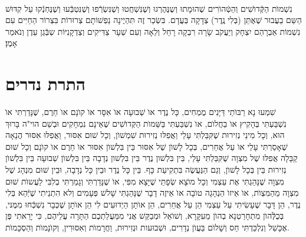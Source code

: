 \documentclass[twoside, openany, parskip=half, 11pt]{book}
\begin{document}
\\
 נִשְׁמוׂת הַקְּֿדוׂשִׁים וְהַטְּֿהוׂרִים
  שֶׁהוּמָתוּ וְשֶנֶּהֶרְגוּ וְשֶׁנִּשְׁחֲטוּ וְשֶׁנִּשְׂרְֿפוּ וְשֶׁנִּטְבְּֿעוּ וְשֶׁנֶּחְנְֿקוּ עַל קִדּוּשׁ הַשֵּם בַעֲבוּר שֶׁאֶתֵּן (בְּלִי נֶֽדֶר) צְדָקָה בְּעֲדָם. בִּשְׂכַר זֶה תִּהְיֶינָה נַפְשׁוֹתָם צְרוּרוֹת בִּצְרוֹר הַחַיִּים עִם נִשְׁמוֹת אַבְרָהַם יִצְחָק וְיַעֲקֹב שָׂרָה רִבְקָה רָחֵל וְלֵאָה וְעִם שְׁעָר צַדִּיקִים וְצַדְקָנִיּוֹת שְבְּֿגַן עֵדֶן וְנֹאמַר אָמֶן׃

\chapter[התרת נדרים]{ התרת נדרים }


שִׁמְעוּ נָא רַבּוׂתַי דַּיָּנִים מֻמְחִים, כָּל נֶדֶר אוׂ שְׁבוּעָה אוׂ אִסָּר אוׂ קוׂנָם אוׂ חֵרֶם, שֶׁנָּדַרְתִּי אוׂ נִשְׁבַּעְתִּי בְּהָקִיץ אוׂ בַחֲלוׂם, אוׂ נִשְׁבַּעְתִּי בַּשֵּׁמוׂת הַקְּדוׂשִׁים שֶׁאֵינָם נִמְחָקִים וּבְשֵׁם הוי"ה בָּרוּךְ הוּא, וְכָל מִינֵי נְזִירוּת שֶׁקִּבַּלְתִּי עָלַי וַאֲפִלּוּ נְזִירוּת שִׁמְשׁוׂן, וְכָל שׁוּם אִסּוּר, וַאֲפִלּוּ אִסּוּר הֲנָאָה שֶׁאָסַרְתִּי עָלַי אוׂ עַל אֲחֵרִים, בְּכָל לָשׁוׂן שֶׁל אִסּוּר בֵּין בִּלְשׁוׂן אִסּוּר אוׂ חֵרֶם אוׂ קוׂנָם וְכָל שׁוּם קַבָּלָה אֲפִלּוּ שֶׁל מִצְוָה שֶׁקִּבַּלְתִּי עָלַי, בֵּין בִּלְשׁון נֶדֶר בֵּין בִּלְשׁון נְדָבָה בֵּין בִּלְשׁוׂן שְׁבוּעָה בֵּין בִּלְשׁוׂן נְזִירוּת בֵּין בְּכָל לָשׁוׂן, וְגַם הַנַּעֲשֶׂה בִּתְקִיעַת כָּף. בֵּין כָּל נֶדֶר וּבֵין כָּל נְדָבָה, וּבֵין שׁוּם מִנְהָג שֶׁל מִצְוָה שֶׁנָּהַגְתִּי אֶת עַצְמִי וְכָל מוׂצָא שְׂפָתַי שֶׁיָּצָא מִפִּי, אוׂ שֶׁנָּדַרְתִּי וְגָמַרְתִּי בְלִבִּי לַעֲשוׂת שׁוּם מִצְוָה מֵהַמִּצְוׂת, אוׂ אֵיזוׂ הַנְהָגָה טוׂבָה אוׂ אֵיזֶה דָבָר שֶׁנָּהַגְתִּי שָׁלשׁ פְּעָמִים וְלא הִתְנֵיתִי שֶׁיְּֿהֵא בְּלִי נֶדֶר, הֵן דָּבָר שֶׁעָשִׂיתִי עַל עַצְמִי הֵן עַל אֲחֵרִים, הֵן אוׂתָן הַיְדוּעִים לִי הֵן אוׂתָן שֶׁכְּבָר נִשְׁכְּֿחוּ מִמֶּנּי, בְּכֻלְּֿהוׂן מִתְחָרַטְנָא בְהוׂן מֵעִקָּרָא, וְשׁוׂאֵל וּמְבַקֵּשׁ אֲנִי מִמַּעֲלַתְכֶם הַתָּרָה עֲלֵיהֶם, כִּי יָרֵאתִי פֶּן אֶכָּשֵׁל וְנִלְכַּדְתִּי חַס וְשָׁלוׂם בַּעֲוׂן נְדָרִים, וּשְׁבוּעות וּנְזִירוּת, וַחֲרָמוׂת וְאִסּוּרִין, וְקוׂנָמוׂת וְהַסְכָּמוׂת.
\end{document}
